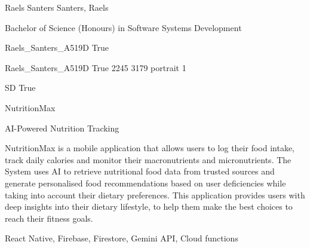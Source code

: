 
\begingroup{}\relax



\def\Key{Raels_Santers_A519D}

{Raels Santers}
{Santers, Raels}

{Bachelor of Science (Honours) in Software Systems Development}

{Raels_Santers_A519D}
{True}

{Raels_Santers_A519D}
{True}
{2245}
{3179}
{portrait}
{1}

{SD}
{True}

{NutritionMax}

{AI-Powered Nutrition Tracking}

{NutritionMax is a mobile application that allows users to log their food intake, track daily calories and monitor their macronutrients and micronutrients. The System uses AI to retrieve nutritional food data from trusted sources and generate personalised food recommendations based on user deficiencies while taking into account their dietary preferences. This application provides users with deep insights into their dietary lifestyle, to help them make the best choices to reach their fitness goals.}

{React Native, Firebase, Firestore, Gemini API, Cloud functions}

